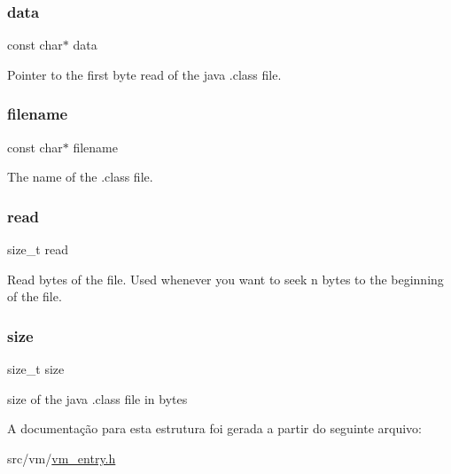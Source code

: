 \subsubsection{\texorpdfstring{data}{data}}
{\footnotesize\ttfamily const char$\ast$ data}



Pointer to the first byte read of the java .class file. 

\mbox{\label{structfile__t_a7efa5e9c7494c7d4586359300221aa5d}} 
\subsubsection{\texorpdfstring{filename}{filename}}
{\footnotesize\ttfamily const char$\ast$ filename}



The name of the .class file. 

\mbox{\label{structfile__t_a2f0fd670edc51b95ab1ede8473aecef3}} 
\subsubsection{\texorpdfstring{read}{read}}
{\footnotesize\ttfamily size\+\_\+t read}

Read bytes of the file. Used whenever you want to seek n bytes to the beginning of the file. \mbox{\label{structfile__t_a854352f53b148adc24983a58a1866d66}} 
\subsubsection{\texorpdfstring{size}{size}}
{\footnotesize\ttfamily size\+\_\+t size}



size of the java .class file in bytes 



A documentação para esta estrutura foi gerada a partir do seguinte arquivo\+:\begin{DoxyCompactItemize}
\item 
src/vm/\hyperlink{vm__entry_8h}{vm\+\_\+entry.\+h}\end{DoxyCompactItemize}
